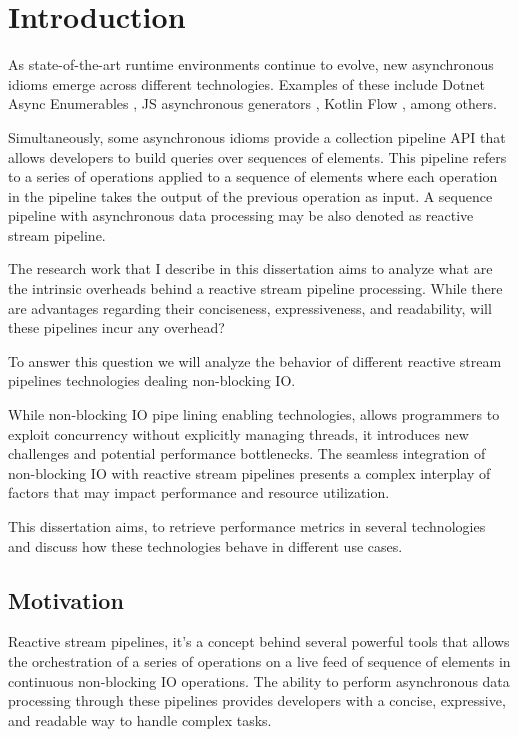 % 
%  
%
\chapter{Introduction}
\label{cha:introduction}


As state-of-the-art runtime environments continue to evolve, new asynchronous idioms emerge across different technologies. Examples of these include Dotnet Async Enumerables \cite{DOTNET_ASYNC_ENUM}, JS asynchronous generators \cite{JS_ASYNC_GENERATOR}, Kotlin Flow \cite{KOTLIN_FLOW}, among others.

Simultaneously, some asynchronous idioms provide a collection pipeline API \cite{FOWLER} that allows developers to build queries over sequences of elements. This pipeline refers to a series of operations applied to a sequence of elements where each operation in the pipeline takes the output of the previous operation as input. A sequence pipeline with asynchronous data processing may be also denoted as reactive stream pipeline.

The research work that I describe in this dissertation aims to analyze what are the intrinsic overheads behind a reactive stream pipeline processing. While there are advantages regarding their conciseness, expressiveness, and readability, will these pipelines incur any overhead?

To answer this question we will analyze the behavior of different reactive stream pipelines technologies dealing non-blocking IO.

While non-blocking IO pipe lining enabling technologies, allows programmers to exploit concurrency without explicitly managing threads, it introduces new challenges and potential performance bottlenecks. The seamless integration of non-blocking IO with reactive stream pipelines presents a complex interplay of factors that may impact performance and resource utilization. 

This dissertation aims, to retrieve performance metrics in several technologies and discuss how these technologies behave in different use cases.

\section{Motivation}
\label{sec:motivation}

Reactive stream pipelines, it's a concept behind several powerful tools that allows the orchestration of a series of operations on a live feed of sequence of elements in continuous non-blocking IO operations. The ability to perform asynchronous data processing through these pipelines provides developers with a concise, expressive, and readable way to handle complex tasks.

